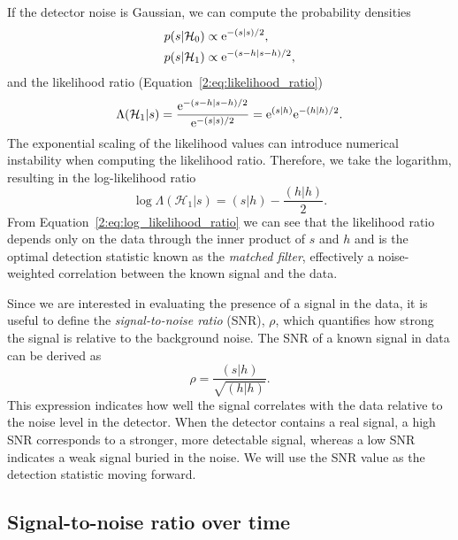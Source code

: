 If the detector noise is Gaussian, we can compute the probability densities
%
\begin{align}
    p(s|\mathcal{H}_{0}) &\propto {\rm e}^{-(s|s)/2}, \\ 
    p(s|\mathcal{H}_{1}) &\propto {\rm e}^{-(s-h|s-h)/2},
\end{align}
%
and the likelihood ratio (Equation~\ref{2:eq:likelihood_ratio})
%
\begin{equation}
    \Lambda(\mathcal{H}_{1}|s) = \frac{{\rm e}^{-(s-h|s-h)/2}}{{\rm e}^{-(s|s)/2}} = {\rm e}^{(s|h)}{\rm e}^{-(h|h)/2}.
\end{equation}
%
The exponential scaling of the likelihood values can introduce numerical instability when computing the likelihood ratio. Therefore, we take the logarithm, resulting in the log-likelihood ratio
%
\begin{equation}
    \log \Lambda(\mathcal{H}_{1}|s) = (s|h) - \frac{(h|h)}{2}.
    \label{2:eq:log_likelihood_ratio}
\end{equation}
%
From Equation~\ref{2:eq:log_likelihood_ratio} we can see that the likelihood ratio depends only on the data through the inner product of $s$ and $h$ and is the optimal detection statistic known as the \textit{matched filter}, effectively a noise-weighted correlation between the known signal and the data.

Since we are interested in evaluating the presence of a signal in the data, it is useful to define the \textit{signal-to-noise ratio} (SNR), \( \rho \), which quantifies how strong the signal is relative to the background noise. The SNR of a known signal in data can be derived as~\cite{FINDCHIRP:2012}
%
\begin{equation}
    \rho = \frac{(s|h)}{\sqrt{(h|h)}}.
    \label{2:eq:snr}
\end{equation}
%
This expression indicates how well the signal correlates with the data relative to the noise level in the detector. When the detector contains a real signal, a high SNR corresponds to a stronger, more detectable signal, whereas a low SNR indicates a weak signal buried in the noise. We will use the SNR value as the detection statistic moving forward.

\subsection{\label{2:sec:snr_timeseries}Signal-to-noise ratio over time}

